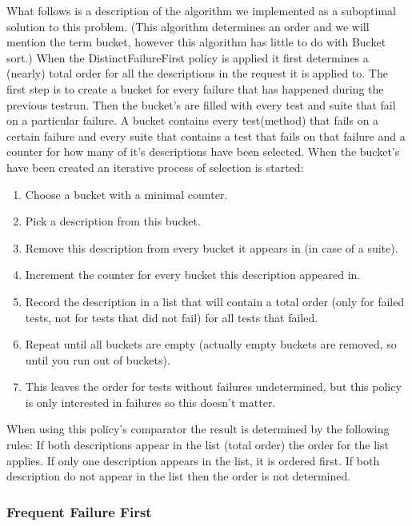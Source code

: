 \documentclass[i2]{oss}
\begin{document}
What follows is a description of the algorithm we implemented as a 
suboptimal solution to this problem.
(This algorithm determines an order and we will mention the term bucket,
however this algorithm has little to do with Bucket sort.)
When the DistinctFailureFirst policy is applied it first determines a 
(nearly) total order for all the descriptions in the request it is 
applied to.
The first step is to create a bucket for every failure that has 
happened during the previous testrun.
Then the bucket's are filled with every test and suite that fail on a 
particular failure.
A bucket contains every test(method) that fails on a certain failure 
and every suite that contains a test that fails on that failure and a 
counter for how many of it's descriptions have been selected.
When the bucket's have been created an iterative process of selection is
started:
\begin{enumerate}
	\item Choose a bucket with a minimal counter.
	\item Pick a description from this bucket.
	\item Remove this description from every bucket it appears in
    		(in case of a suite).
	\item Increment the counter for every bucket this description
    		appeared in.
	\item Record the description in a list that will contain a total 
    		order
            (only for failed tests, not for tests that did not fail)
			for all tests that failed.
	\item Repeat until all buckets are empty (actually empty buckets 
    		are removed, so until you run out of buckets).
	\item This leaves the order for tests without failures 
    		undetermined, but this policy is only interested in 
           	failures so this doesn't matter.
\end{enumerate}
When using this policy's comparator the result is determined by the 
following rules:
If both descriptions appear in the list (total order) the order for the 
list applies.
If only one description appears in the list, it is ordered first.
If both description do not appear in the list then the order is not 
determined.


\subsubsection{Frequent Failure First}
\end{document}
